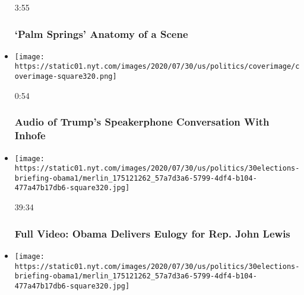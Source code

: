\begin{itemize}
  3:55

  \hypertarget{palm-springs--anatomy-of-a-scene}{%
  \subsubsection{`Palm Springs' \textbar{} Anatomy of a
  Scene}\label{palm-springs--anatomy-of-a-scene}}
\item
  \href{https://www.nytimes.com/video/us/politics/100000007265038/trump-inhofe-audio-call.html?action=click\&module=video-series-bar\&region=header\&pgtype=Article\&playlistId=video/latest-video}{}

  \texttt{[image: https://static01.nyt.com/images/2020/07/30/us/politics/coverimage/coverimage-square320.png]}

  0:54

  \hypertarget{audio-of-trumps-speakerphone-conversation-with-inhofe}{%
  \subsubsection{Audio of Trump's Speakerphone Conversation With
  Inhofe}\label{audio-of-trumps-speakerphone-conversation-with-inhofe}}
\item
  \href{https://www.nytimes.com/video/us/100000007264733/obama-john-lewis-funeral.html?action=click\&module=video-series-bar\&region=header\&pgtype=Article\&playlistId=video/latest-video}{}

  \texttt{[image: https://static01.nyt.com/images/2020/07/30/us/politics/30elections-briefing-obama1/merlin\_175121262\_57a7d3a6-5799-4df4-b104-477a47b17db6-square320.jpg]}

  39:34

  \hypertarget{full-video-obama-delivers-eulogy-for-rep-john-lewis}{%
  \subsubsection{Full Video: Obama Delivers Eulogy for Rep. John
  Lewis}\label{full-video-obama-delivers-eulogy-for-rep-john-lewis}}
\item
  \href{https://www.nytimes.com/video/us/politics/100000007264823/john-lewis-funeral.html?action=click\&module=video-series-bar\&region=header\&pgtype=Article\&playlistId=video/latest-video}{}

  \texttt{[image: https://static01.nyt.com/images/2020/07/30/us/politics/30elections-briefing-obama1/merlin\_175121262\_57a7d3a6-5799-4df4-b104-477a47b17db6-square320.jpg]}


\end{itemize}
